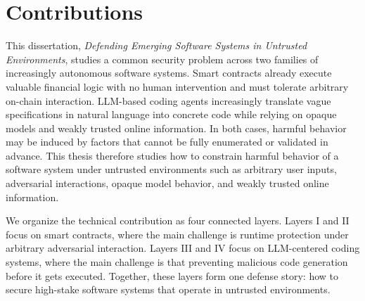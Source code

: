 \section{Contributions}

This dissertation, \emph{Defending Emerging Software Systems in Untrusted Environments}, 
studies a common security problem across two families of 
increasingly autonomous software systems. 
Smart contracts already execute valuable financial logic with 
no human intervention and must tolerate arbitrary 
on-chain interaction. 
LLM-based coding agents increasingly translate vague specifications 
in natural language
into concrete code while relying on opaque models and weakly 
trusted online information. 
In both cases, harmful behavior may be induced by factors that cannot 
be fully enumerated or validated in advance. This thesis 
therefore studies how to constrain harmful behavior 
of a software system under untrusted environments
such as 
arbitrary user inputs, 
adversarial interactions, opaque model behavior, 
and weakly trusted online information.


We organize the technical contribution as four connected layers. 
Layers I and II focus on smart contracts, where 
the main challenge is runtime protection 
under arbitrary adversarial interaction. 
Layers III and IV focus on LLM-centered coding systems, 
where the main challenge is that preventing malicious code generation
before it gets executed.  
Together, these layers form one defense story: 
how to secure high-stake software systems that 
operate in untrusted environments. 


